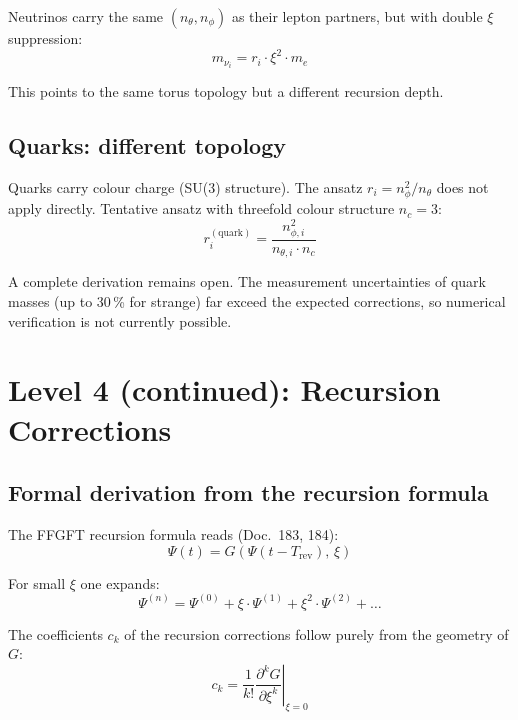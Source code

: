 Neutrinos carry the same $(n_\theta, n_\phi)$ as their lepton partners,
but with double $\xi$ suppression:
\begin{equation}
    m_{\nu_i} = r_i \cdot \xi^2 \cdot m_e
\end{equation}

This points to the same torus topology but a different recursion depth.

\subsection{Quarks: different topology}

Quarks carry colour charge (SU(3) structure). The ansatz
$r_i = n_\phi^2 / n_\theta$ does not apply directly. Tentative
ansatz with threefold colour structure $n_c = 3$:
\begin{equation}
    r_i^{(\mathrm{quark})} = \frac{n_{\phi,i}^2}{n_{\theta,i} \cdot n_c}
\end{equation}

A complete derivation remains open. The measurement uncertainties
of quark masses (up to 30\,\% for strange) far exceed the expected
corrections, so numerical verification is not currently possible.

\section{Level 4 (continued): Recursion Corrections}

\subsection{Formal derivation from the recursion formula}

The FFGFT recursion formula reads (Doc.~183, 184):
\begin{equation}
    \Psi(t) = G\!\left(\Psi(t - T_{\mathrm{rev}}),\, \xi\right)
    \label{eq:recursion}
\end{equation}

For small $\xi$ one expands:
\begin{equation}
    \Psi^{(n)} = \Psi^{(0)}
    + \xi \cdot \Psi^{(1)}
    + \xi^2 \cdot \Psi^{(2)}
    + \ldots
\end{equation}

The coefficients $c_k$ of the recursion corrections follow purely
from the geometry of $G$:
\begin{equation}
    c_k = \frac{1}{k!}
    \left.\frac{\partial^k G}{\partial \xi^k}\right|_{\xi=0}
    \label{eq:ck}
\end{equation}

